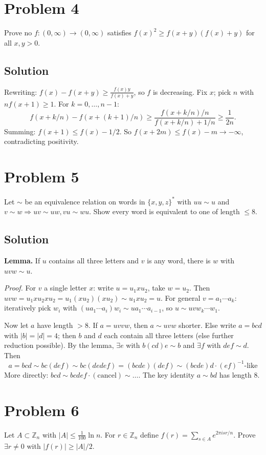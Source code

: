 \documentclass{article}
\begin{document}
\section*{Problem 4}
Prove no $f:(0,\infty)\to(0,\infty)$ satisfies $f(x)^2 \ge f(x+y)(f(x)+y)$ for all $x,y>0$.

\subsection*{Solution}
Rewriting: $f(x)-f(x+y) \ge \frac{f(x)y}{f(x)+y}$, so $f$ is decreasing. Fix $x$; pick $n$ with $nf(x+1)\ge 1$. For $k=0,\dots,n-1$:
\[f(x+k/n)-f(x+(k+1)/n) \ge \frac{f(x+k/n)/n}{f(x+k/n)+1/n} \ge \frac{1}{2n}.\]
Summing: $f(x+1) \le f(x) - 1/2$. So $f(x+2m) \le f(x) - m\to -\infty$, contradicting positivity.

\section*{Problem 5}
Let $\sim$ be an equivalence relation on words in $\{x,y,z\}^*$ with $uu\sim u$ and $v\sim w \Rightarrow uv\sim uw, vu\sim wu$. Show every word is equivalent to one of length $\le 8$.

\subsection*{Solution}
\textbf{Lemma.} If $u$ contains all three letters and $v$ is any word, there is $w$ with $uvw\sim u$.

\textit{Proof.} For $v$ a single letter $x$: write $u=u_1 x u_2$, take $w=u_2$. Then $uvw = u_1 x u_2 x u_2 = u_1(xu_2)(xu_2) \sim u_1 xu_2 = u$. For general $v=a_1\cdots a_k$: iteratively pick $w_i$ with $(ua_1\cdots a_i)w_i \sim ua_1\cdots a_{i-1}$, so $u\sim uvw_k\cdots w_1$.

Now let $a$ have length $>8$. If $a = uvvw$, then $a\sim uvw$ shorter. Else write $a=bcd$ with $|b|=|d|=4$; then $b$ and $d$ each contain all three letters (else further reduction possible). By the lemma, $\exists e$ with $b(cd)e\sim b$ and $\exists f$ with $def\sim d$. Then
\[a = bcd \sim bc(def) \sim bc(dedef) = (bcde)(def) \sim (bcde) d \cdot (ef)^{-1}\text{-like}\]
More directly: $bcd \sim bcdef\cdot (\text{cancel}) \sim \dots$. The key identity $a\sim bd$ has length $8$.

\section*{Problem 6}
Let $A\subset\mathbb{Z}_n$ with $|A|\le \frac{1}{100}\ln n$. For $r\in\mathbb{Z}_n$ define $f(r)=\sum_{s\in A}e^{2\pi i sr/n}$. Prove $\exists r\ne 0$ with $|f(r)|\ge |A|/2$.
\end{document}
